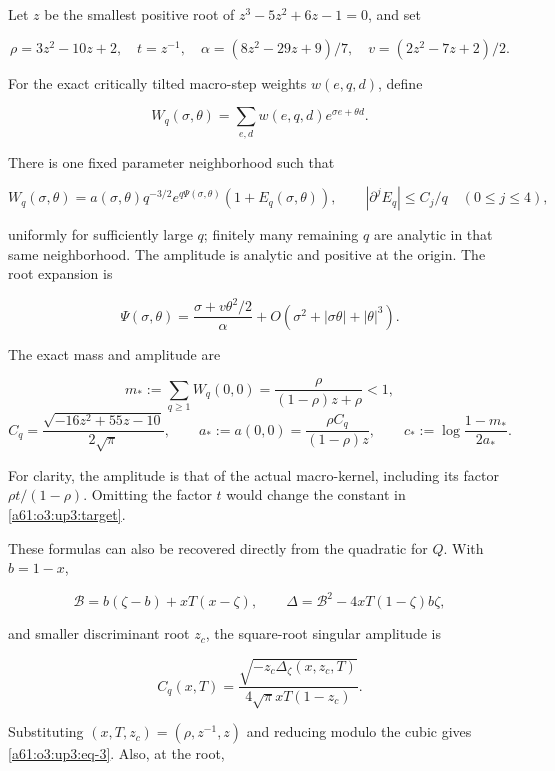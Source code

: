\documentclass[11pt,letterpaper]{article}
\numberwithin{equation}{section}
\theoremstyle{remark}\newtheorem{remark}[theorem]{Remark}
\begin{document}
Let \(z\) be the smallest positive root of \(z^3-5z^2+6z-1=0\), and set

\[
\rho=3z^2-10z+2,\quad t=z^{-1},\quad
\alpha=(8z^2-29z+9)/7,\quad v=(2z^2-7z+2)/2.
\]

For the exact critically tilted macro-step weights \(w(e,q,d)\), define

\[
W_q(\sigma,\theta)=\sum_{e,d}w(e,q,d)e^{\sigma e+\theta d}.
\]

There is one fixed parameter neighborhood such that

\begin{equation}
W_q(\sigma,\theta)
 =a(\sigma,\theta)q^{-3/2}e^{q\Psi(\sigma,\theta)}
   (1+E_q(\sigma,\theta)),\qquad
|\partial^j E_q|\le C_j/q\quad (0\le j\le4),
\label{a61:o3:up3:eq-1}
\end{equation}

uniformly for sufficiently large \(q\); finitely many remaining \(q\)
are analytic in that same neighborhood. The amplitude is analytic and
positive at the origin. The root expansion is

\begin{equation}
\Psi(\sigma,\theta)
 =\frac{\sigma+v\theta^2/2}{\alpha}
   +O(\sigma^2+|\sigma\theta|+|\theta|^3).
\label{a61:o3:up3:eq-2}
\end{equation}

The exact mass and amplitude are

\[
m_*:=\sum_{q\ge1}W_q(0,0)=\frac{\rho}{(1-\rho)z+\rho}<1,
\] \begin{equation}
C_q=\frac{\sqrt{-16z^2+55z-10}}{2\sqrt\pi},\qquad
 a_*:=a(0,0)=\frac{\rho C_q}{(1-\rho)z},\qquad
 c_*:=\log\frac{1-m_*}{2a_*}.
\label{a61:o3:up3:eq-3}
\end{equation}

For clarity, the amplitude is that of the actual macro-kernel, including
its factor \(\rho t/(1-\rho)\). Omitting the factor \(t\) would change
the constant in \eqref{a61:o3:up3:target}.

These formulas can also be recovered directly from the quadratic for
\(Q\). With \(b=1-x\),

\[
\mathcal B=b(\zeta-b)+xT(x-\zeta),\qquad
\Delta=\mathcal B^2-4xT(1-\zeta)b\zeta,
\]

and smaller discriminant root \(z_c\), the square-root singular
amplitude is

\[
C_q(x,T)=\frac{\sqrt{-z_c\Delta_\zeta(x,z_c,T)}}
 {4\sqrt\pi xT(1-z_c)}.
\]

Substituting \((x,T,z_c)=(\rho,z^{-1},z)\) and reducing modulo the cubic
gives \eqref{a61:o3:up3:eq-3}. Also, at the root,
\end{document}

